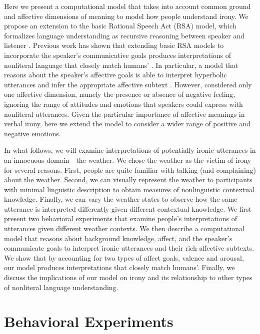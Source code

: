 \documentclass[10pt,letterpaper]{article}
\begin{document}
Here we present a computational model that takes into account common ground and affective dimensions of meaning to model how people understand irony. We propose an extension to the basic Rational Speech Act (RSA) model, which formalizes language understanding as recursive reasoning between speaker and listener \cite{frank2012predicting, goodman2013knowledge}. Previous work has shown that extending basic RSA models to incorporate the speaker's communicative goals produces interpretations of nonliteral language that closely match humans' \cite{kao2014nonliteral, kao2014formalizing}. In particular, a model that reasons about the speaker's affective goals is able to interpret hyperbolic utterances and infer the appropriate affective subtext \cite{kao2014nonliteral}. However, \cite{kao2014nonliteral} considered only one affective dimension, namely the presence or absence of negative feeling, ignoring the range of attitudes and emotions that speakers could express with nonliteral utterances. Given the particular importance of affective meanings in verbal irony, here we extend the model to consider a wider range of positive and negative emotions. 

In what follows, we will examine interpretations of potentially ironic utterances in an innocuous domain---the weather. We chose the weather as the victim of irony for several reasons. First, people are quite familiar with talking (and complaining) about the weather. Second, we can visually represent the weather to participants with minimal linguistic description to obtain measures of nonlinguistic contextual knowledge. Finally, we can vary the weather states to observe how the same utterance is interpreted differently given different contextual knowledge. We first  present two behavioral experiments that examine people's interpretations of utterances given different weather contexts. We then describe a computational model that reasons about background knowledge, affect, and the speaker's communicate goals to interpret ironic utterances and their rich affective subtexts. We show that by accounting for two types of affect goals, valence and arousal, our model produces interpretations that closely match humans'. Finally, we discuss the implications of our model on irony and its relationship to other types of nonliteral language understanding.

\section{Behavioral Experiments}
\end{document}
